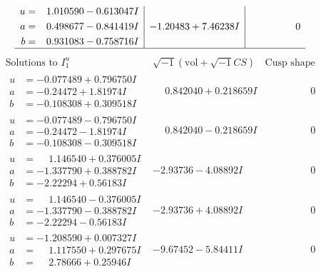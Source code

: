 \documentclass[1p]{elsarticle_modified}
\theoremstyle{definition}
\newcommand{\I}{\sqrt{-1}}
\begin{document}
$$\begin{array}{c|c|c}
\begin{aligned}
u &= \phantom{-}1.010590 - 0.613047 I \\
a &= \phantom{-}0.498677 - 0.841419 I \\
b &= \phantom{-}0.931083 - 0.758716 I\end{aligned}
 & -1.20483 + 7.46238 I & \phantom{-0.000000 } 0\\
 \hline 
 \end{array}$$\newpage$$\begin{array}{c|c|c}  
\text{Solutions to }I^u_{1}& \I (\text{vol} + \sqrt{-1}CS) & \text{Cusp shape}\\
 \hline 
\begin{aligned}
u &= -0.077489 + 0.796750 I \\
a &= -0.24472 + 1.81974 I \\
b &= -0.108308 + 0.309518 I\end{aligned}
 & \phantom{-}0.842040 + 0.218659 I & \phantom{-0.000000 } 0 \\ \hline\begin{aligned}
u &= -0.077489 - 0.796750 I \\
a &= -0.24472 - 1.81974 I \\
b &= -0.108308 - 0.309518 I\end{aligned}
 & \phantom{-}0.842040 - 0.218659 I & \phantom{-0.000000 } 0 \\ \hline\begin{aligned}
u &= \phantom{-}1.146540 + 0.376005 I \\
a &= -1.337790 + 0.388782 I \\
b &= -2.22294 + 0.56183 I\end{aligned}
 & -2.93736 - 4.08892 I & \phantom{-0.000000 } 0 \\ \hline\begin{aligned}
u &= \phantom{-}1.146540 - 0.376005 I \\
a &= -1.337790 - 0.388782 I \\
b &= -2.22294 - 0.56183 I\end{aligned}
 & -2.93736 + 4.08892 I & \phantom{-0.000000 } 0 \\ \hline\begin{aligned}
u &= -1.208590 + 0.007327 I \\
a &= \phantom{-}1.117550 + 0.297675 I \\
b &= \phantom{-}2.78666 + 0.25946 I\end{aligned}
 & -9.67452 - 5.84411 I & \phantom{-0.000000 } 0 \\ \hline\begin{aligned}

\end{aligned}
\end{array}$$
\end{document}
